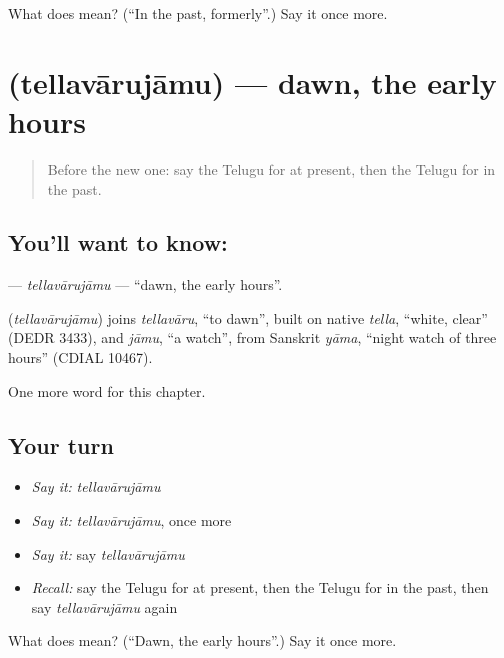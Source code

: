 \begin{tcolorbox}[breakable,colback=teal!4,colframe=teal!35!black,title={Before you move on}]
What does  mean? (\textquotedblleft{}In the past, formerly\textquotedblright{}.) Say it once more.
\end{tcolorbox}
\section[\texorpdfstring{\te{తెల్లవారుజాము} (tellavārujāmu)}{తెల్లవారుజాము (tellavārujāmu)}]{ (tellavārujāmu) — dawn, the early hours}

\label{lesson:TE-C253-tellavarujamu}



\begin{quote}
Before the new one: say the Telugu for at present, then the Telugu for in the past.
\end{quote}

\subsection*{You'll want to know: }
\textbf{} — \emph{tellavārujāmu} — \textquotedblleft{}dawn, the early hours\textquotedblright{}.

\begin{cousinweb}
\textbf{} (\emph{tellavārujāmu}) joins \emph{tellavāru}, \textquotedblleft{}to dawn\textquotedblright{}, built on native \emph{tella}, \textquotedblleft{}white, clear\textquotedblright{} (DEDR 3433), and \emph{jāmu}, \textquotedblleft{}a watch\textquotedblright{}, from Sanskrit \emph{yāma}, \textquotedblleft{}night watch of three hours\textquotedblright{} (CDIAL 10467).
\end{cousinweb}

\begin{grammarlens}[title={What you've built}]
One more word for this chapter.
\end{grammarlens}

\subsection*{Your turn}
\begin{itemize}
\raggedright
  \item \emph{Say it:} \emph{tellavārujāmu}
  \item \emph{Say it:} \emph{tellavārujāmu}, once more
  \item \emph{Say it:} say \emph{tellavārujāmu}
  \item \emph{Recall:} say the Telugu for at present, then the Telugu for in the past, then say \emph{tellavārujāmu} again
\end{itemize}

\begin{tcolorbox}[breakable,colback=teal!4,colframe=teal!35!black,title={Before you move on}]
What does  mean? (\textquotedblleft{}Dawn, the early hours\textquotedblright{}.) Say it once more.
\end{tcolorbox}
